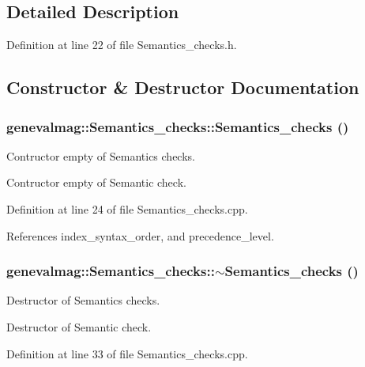\subsection{Detailed Description}


Definition at line 22 of file Semantics\_\-checks.h.

\subsection{Constructor \& Destructor Documentation}
\hypertarget{classgenevalmag_1_1Semantics__checks_332b806015b2d142ebaaa5ec5f7f6078}{
\subsubsection[{Semantics\_\-checks}]{\setlength{\rightskip}{0pt plus 5cm}genevalmag::Semantics\_\-checks::Semantics\_\-checks ()}}
\label{classgenevalmag_1_1Semantics__checks_332b806015b2d142ebaaa5ec5f7f6078}


Contructor empty of Semantics checks.

Contructor empty of Semantic check. 

Definition at line 24 of file Semantics\_\-checks.cpp.

References index\_\-syntax\_\-order, and precedence\_\-level.\hypertarget{classgenevalmag_1_1Semantics__checks_77ad2416d9844554db3602939a9f462c}{
\subsubsection[{$\sim$Semantics\_\-checks}]{\setlength{\rightskip}{0pt plus 5cm}genevalmag::Semantics\_\-checks::$\sim$Semantics\_\-checks ()}}
\label{classgenevalmag_1_1Semantics__checks_77ad2416d9844554db3602939a9f462c}


Destructor of Semantics checks.

Destructor of Semantic check. 

Definition at line 33 of file Semantics\_\-checks.cpp.

